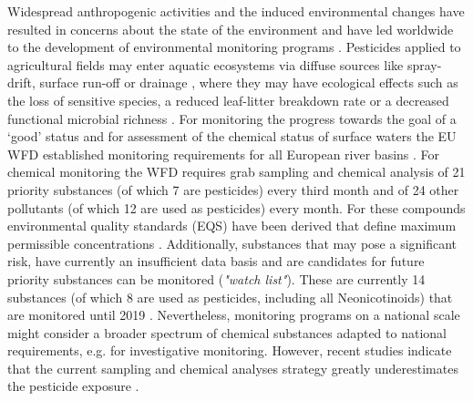 Widespread anthropogenic activities and the induced environmental changes have resulted in concerns about the state of the environment and have led worldwide to the development of environmental monitoring programs \citep{nichols_monitoring_2006}. 
Pesticides applied to agricultural fields may enter aquatic ecosystems via diffuse sources like spray-drift, surface run-off or drainage \citep{schulz_field_2004, stehle_probabilistic_2013, liess_determination_1999, carter_how_2000}, where they may have ecological effects such as the loss of sensitive species, a reduced leaf-litter breakdown rate or a decreased functional microbial richness \citep{liess_analyzing_2005, schafer_effects_2007, schafer_effects_2012}.
For monitoring the progress towards the goal of a `good' status and for assessment of the chemical status of surface waters the EU WFD established monitoring requirements for all European river basins \citep{european_union_directive_2000}. 
For chemical monitoring the WFD requires grab sampling and chemical analysis of 21 priority substances (of which 7 are pesticides) every third month and of 24 other pollutants (of which 12 are used as pesticides) every month.
For these compounds environmental quality standards (EQS) have been derived that define maximum permissible concentrations \citep{european_union_directive_2013}. 
Additionally, substances that may pose a significant risk, have currently an insufficient data basis and are candidates for future priority substances can be monitored (\emph{"watch list"}).
These are currently 14 substances (of which 8 are used as pesticides, including all Neonicotinoids) that are monitored until 2019 \citep{european_union_commission_2015}.
Nevertheless, monitoring programs on a national scale might consider a broader spectrum of chemical substances adapted to national requirements, e.g. for investigative monitoring.
However, recent studies indicate that the current sampling and chemical analyses strategy greatly underestimates the pesticide exposure \citep{stehle_probabilistic_2013, xing_influences_2013, moschet_how_2014}. 

